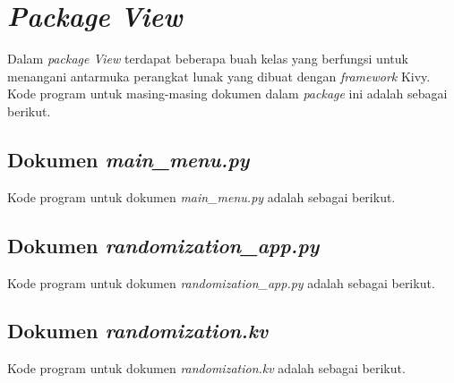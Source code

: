\section{\textit{Package View}}
\label{sec:p-view}

Dalam \textit{package View} terdapat beberapa buah kelas yang berfungsi untuk menangani antarmuka perangkat lunak yang dibuat dengan \textit{framework} Kivy. Kode program untuk masing-masing dokumen dalam \textit{package} ini adalah sebagai berikut.

\subsection{Dokumen \textit{main\_menu.py}}
\label{subsec:c-main}
Kode program untuk dokumen \textit{main\_menu.py} adalah sebagai berikut.


\subsection{Dokumen \textit{randomization\_app.py}}
\label{subsec:c-randomization-app}
Kode program untuk dokumen \textit{randomization\_app.py} adalah sebagai berikut.


\subsection{Dokumen \textit{randomization.kv}}
\label{subsec:c-randomization}
Kode program untuk dokumen \textit{randomization.kv} adalah sebagai berikut.
